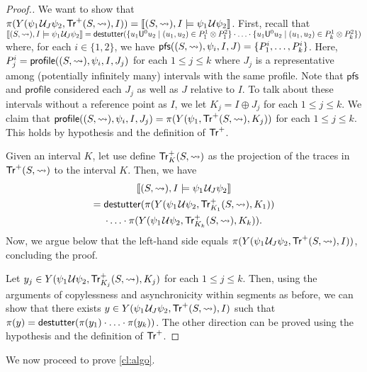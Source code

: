 \begin{proof}[\normalsize Proof.]
	We want to show that $\pi(Y(\psi_1 \kern.1em\mathcal{U}_J \psi_2, \mathsf{Tr}^+(S,{\rightsquigarrow}), I)) = \llbracket (S,{\rightsquigarrow}), I \models \psi_1 \kern.1em\mathcal{U} \psi_2 \rrbracket$.
	First, recall that $\llbracket (S,{\hb}), I \models \psi_1 \until_J \psi_2 \rrbracket = \destutter( \{ u_1 \mathsf{U}^0 u_2 \st (u_1, u_2) \in P^1_1 \otimes P^2_1 \} \cdot \ldots \cdot \{ u_1 \mathsf{U}^0 u_2 \st (u_1, u_2) \in P^1_k \otimes P^2_k \} )$ where, for each $i \in \{1,2\}$, we have $\mathsf{pfs}((S,{\rightsquigarrow}), \psi_i, I, J) = \{P^i_1, \ldots, P^i_k\}$.
	Here, $P^i_j = \mathsf{profile}((S,{\rightsquigarrow}), \psi_i, I, J_j)$ for each $1 \leq j \leq k$ where $J_j$ is a representative among (potentially infinitely many) intervals with the same profile.
	Note that $\mathsf{pfs}$ and $\mathsf{profile}$ considered each $J_j$ as well as $J$ relative to $I$.
	To talk about these intervals without a reference point as $I$, we let $K_j = I \oplus J_j$ for each $1 \leq j \leq k$.
	We claim that $\mathsf{profile}((S,{\rightsquigarrow}), \psi_i, I, J_j) = \pi(Y(\psi_1, \mathsf{Tr}^+(S,{\rightsquigarrow}), K_j))$ for each $1 \leq j \leq k$.
	This holds by hypothesis and the definition of $\mathsf{Tr}^+$.
	
	Given an interval $K$, let use define $\mathsf{Tr}^+_K(S,{\rightsquigarrow})$ as the projection of the traces in $\mathsf{Tr}^+(S,{\rightsquigarrow})$ to the interval $K$.
	Then, we have
	\begin{multline*}
		\llbracket (S,{\rightsquigarrow}), I \models \psi_1 \kern.1em\mathcal{U}_J \psi_2 \rrbracket \\
		= \mathsf{destutter}( \pi(Y(\psi_1 \kern.1em\mathcal{U} \psi_2, \mathsf{Tr}^+_{K_1}(S,{\rightsquigarrow}), K_1)) \\
		\cdot \ldots \cdot \pi(Y(\psi_1 \kern.1em\mathcal{U} \psi_2, \mathsf{Tr}^+_{K_k}(S,{\rightsquigarrow}), K_k)).
	\end{multline*}
	Now, we argue below that the left-hand side equals $\pi(Y(\psi_1 \kern.1em\mathcal{U}_J \psi_2, \mathsf{Tr}^+(S,{\rightsquigarrow}), I ))$, concluding the proof.
	
	Let $y_j \in Y(\psi_1 \kern.1em\mathcal{U} \psi_2, \mathsf{Tr}^+_{K_j}(S,{\rightsquigarrow}), K_j)$ for each $1 \leq j \leq k$.
	Then, using the arguments of copylessness and asynchronicity within segments as before, we can show that there exists $y \in Y(\psi_1 \kern.1em\mathcal{U}_J \psi_2, \mathsf{Tr}^+(S,{\rightsquigarrow}), I)$ such that $\pi(y) = \mathsf{destutter}( \pi(y_1) \cdot \ldots \cdot \pi(y_k) )$.
	The other direction can be proved using the hypothesis and the definition of $\mathsf{Tr}^+$.
\end{proof}

We now proceed to prove \cref{cl:algo}.

